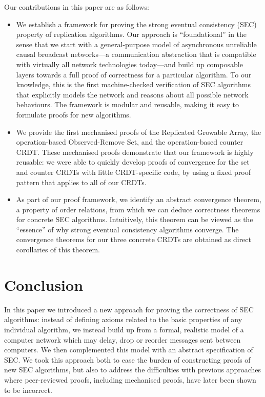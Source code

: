 \documentclass[acmlarge,review,anonymous]{acmart}
\begin{document}
Our contributions in this paper are as follows:
\begin{itemize}
\item
We establish a framework for proving the strong eventual consistency (SEC) property of replication algorithms.
Our approach is ``foundational'' in the sense that we start with a general-purpose model of asynchronous unreliable causal broadcast networks---a communication abstraction that is compatible with virtually all network technologies today---and build up composable layers towards a full proof of correctness for a particular algorithm.
To our knowledge, this is the first machine-checked verification of SEC algorithms that explicitly models the network and reasons about all possible network behaviours.
The framework is modular and reusable, making it easy to formulate proofs for new algorithms.
\item
We provide the first mechanised proofs of the Replicated Growable Array, the operation-based Observed-Remove Set, and the operation-based counter CRDT.
These mechanised proofs demonstrate that our framework is highly reusable: we were able to quickly develop proofs of convergence for the set and counter CRDTs with little CRDT-specific code, by using a fixed proof pattern that applies to all of our CRDTs.
\item
As part of our proof framework, we identify an abstract convergence theorem, a property of order relations, from which we can deduce correctness theorems for concrete SEC algorithms.
Intuitively, this theorem can be viewed as the ``essence'' of why strong eventual consistency algorithms converge.
The convergence theorems for our three concrete CRDTs are obtained as direct corollaries of this theorem.
\end{itemize}








\section{Conclusion}
\label{sect.conclusion}

In this paper we introduced a new approach for proving the correctness of SEC algorithms: instead of defining axioms related to the basic properties of any individual algorithm, we instead build up from a formal, realistic model of a computer network which may delay, drop or reorder messages sent between computers.
We then complemented this model with an abstract specification of SEC.
We took this approach both to ease the burden of constructing proofs of new SEC algorithms, but also to address the difficulties with previous approaches where peer-reviewed proofs, including mechanised proofs, have later been shown to be incorrect.
\end{document}
